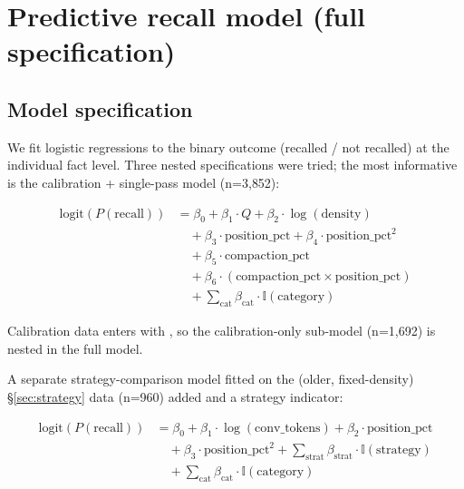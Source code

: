 \section{Predictive recall model (full specification)}
\label{sec:appendix-model}

\subsection{Model specification}
\label{sec:model-spec}

We fit logistic regressions to the binary outcome (recalled / not
recalled) at the individual fact level. Three nested specifications were
tried; the most informative is the calibration + single-pass model
(n=3{,}852):

\begin{equation}
\begin{aligned}
\mathrm{logit}(P(\text{recall})) &= \beta_0 + \beta_1 \cdot Q + \beta_2 \cdot \log(\text{density}) \\
&\quad + \beta_3 \cdot \text{position\_pct} + \beta_4 \cdot \text{position\_pct}^2 \\
&\quad + \beta_5 \cdot \text{compaction\_pct} \\
&\quad + \beta_6 \cdot (\text{compaction\_pct} \times \text{position\_pct}) \\
&\quad + \sum_{\text{cat}} \beta_{\text{cat}} \cdot \mathbb{I}(\text{category})
\end{aligned}
\end{equation}

Calibration data enters with , so the calibration-only
sub-model (n=1{,}692) is nested in the full model.

A separate strategy-comparison model fitted on the (older, fixed-density)
\S\ref{sec:strategy} data (n=960) added  and a strategy indicator:

\begin{equation}
\begin{aligned}
\mathrm{logit}(P(\text{recall})) &= \beta_0 + \beta_1 \cdot \log(\text{conv\_tokens}) + \beta_2 \cdot \text{position\_pct} \\
&\quad + \beta_3 \cdot \text{position\_pct}^2 + \sum_{\text{strat}} \beta_{\text{strat}} \cdot \mathbb{I}(\text{strategy}) \\
&\quad + \sum_{\text{cat}} \beta_{\text{cat}} \cdot \mathbb{I}(\text{category})
\end{aligned}
\end{equation}


